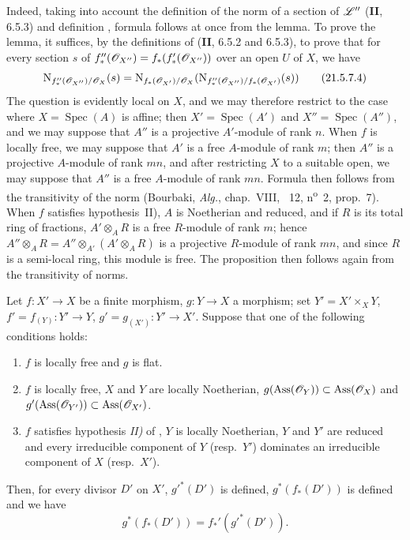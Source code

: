 Indeed, taking into account the definition of the norm of a section of $\mathscr{L}''$ (\textbf{II}, 6.5.3) and definition , formula  follows at once from the lemma.
To prove the lemma, it suffices, by the definitions of (\textbf{II}, 6.5.2 and 6.5.3), to prove that for every section $s$ of $f_*''(\mathscr{O}_{X''})=f_*(f_*'(\mathscr{O}_{X''}))$ over an open $U$ of $X$, we have
\[
\label{IV.21.5.7.4}
  \mathrm{N}_{f_*''(\mathscr{O}_{X''})/\mathscr{O}_X}(s)=\mathrm{N}_{f_*(\mathscr{O}_{X'})/\mathscr{O}_X}(\mathrm{N}_{f_*''(\mathscr{O}_{X''})/f_*(\mathscr{O}_{X'})}(s))
  \tag{21.5.7.4}
\]
The question is evidently local on $X$, and we may therefore restrict to the case where $X=\operatorname{Spec}(A)$ is affine;
then $X'=\operatorname{Spec}(A')$ and $X''=\operatorname{Spec}(A'')$, and we may suppose that $A''$ is a projective $A'$-module of rank $n$.
When $f$ is locally free, we may suppose that $A'$ is a free $A$-module of rank $m$;
then $A''$ is a projective $A$-module of rank $mn$, and after restricting $X$ to a suitable open, we may suppose that $A''$ is a free $A$-module of rank $mn$.
Formula  then follows from the transitivity of the norm (Bourbaki, \emph{Alg.}, chap.~VIII, \textsection~12, n\textsuperscript{o}~2, prop.~7).
When $f$ satisfies hypothesis~II), $A$ is Noetherian and reduced, and if $R$ is its total ring of fractions, $A'\otimes_A R$ is a free $R$-module of rank $m$;
hence $A''\otimes_A R=A''\otimes_{A'}(A'\otimes_A R)$ is a projective $R$-module of rank $mn$, and since $R$ is a semi-local ring, this module is free.
The proposition then follows again from the transitivity of norms.

\begin{proposition}[21.5.8]
\label{IV.21.5.8}
Let $f:X'\to X$ be a finite morphism, $g:Y\to X$ a morphism;
set $Y'=X'\times_XY$, $f'=f_{(Y)}:Y'\to Y$, $g'=g_{(X')}:Y'\to X'$.
Suppose that one of the following conditions holds:
\begin{enumerate}[label=\textup{(\roman*)}]
  \item $f$ is locally free and $g$ is flat.
  \item $f$ is locally free, $X$ and $Y$ are locally Noetherian, $g(\operatorname{Ass}(\mathscr{O}_Y))\subset\operatorname{Ass}(\mathscr{O}_X)$ and $g'(\operatorname{Ass}(\mathscr{O}_{Y'}))\subset\operatorname{Ass}(\mathscr{O}_{X'})$.
  \item $f$ satisfies hypothesis \emph{II)} of , $Y$ is locally Noetherian, $Y$ and $Y'$ are reduced and every irreducible component of $Y$ \textup{(resp.\ $Y'$)} dominates an irreducible component of $X$ \textup{(resp.\ $X'$)}.
\end{enumerate}
Then, for every divisor $D'$ on $X'$, $g'^*(D')$ is defined, $g^*(f_*(D'))$ is defined and we have
\[
\label{IV.21.5.8.1}
  g^*(f_*(D'))=f_*'(g'^*(D')).
  \tag{21.5.8.1}
\]
\end{proposition}

